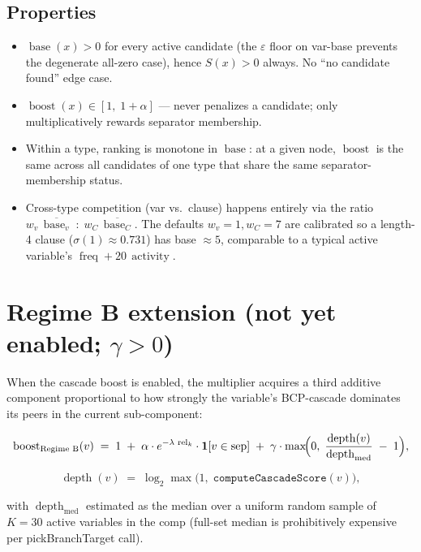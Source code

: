 \documentclass[11pt]{article}
\begin{document}
\subsection*{Properties}

\begin{itemize}
  \item $\operatorname{base}(x) > 0$ for every active candidate (the
        $\varepsilon$ floor on var-base prevents the degenerate
        all-zero case), hence $S(x) > 0$ always. No ``no candidate found'' edge case.
  \item $\operatorname{boost}(x) \in [1,\; 1+\alpha]$ --- never penalizes a candidate;
        only multiplicatively rewards separator membership.
  \item Within a type, ranking is monotone in $\operatorname{base}$: at a
        given node, $\operatorname{boost}$ is the same across all candidates of one
        type that share the same separator-membership status.
  \item Cross-type competition (var vs.\ clause) happens entirely via the
        ratio $w_v \, \overline{\operatorname{base}_v} \;:\; w_C \, \overline{\operatorname{base}_C}$.
        The defaults $w_v = 1, w_C = 7$ are calibrated so a length-4 clause
        ($\sigma(1) \approx 0.731$) has base $\approx 5$, comparable to a typical
        active variable's $\operatorname{freq} + 20\,\operatorname{activity}$.
\end{itemize}

\section{Regime B extension (not yet enabled; $\gamma > 0$)}

When the cascade boost is enabled, the multiplier acquires a third additive
component proportional to how strongly the variable's BCP-cascade dominates
its peers in the current sub-component:

\[
\operatorname{boost}_{\text{Regime B}}(v) \;=\; 1
   \;+\; \alpha \cdot e^{-\lambda \, \operatorname{rel}_k} \cdot \mathbf{1}[v \in \mathrm{sep}]
   \;+\; \gamma \cdot \max\!\Bigl(0,\; \frac{\operatorname{depth}(v)}{\operatorname{depth}_{\mathrm{med}}} \;-\; 1\Bigr),
\]

\[
\operatorname{depth}(v) \;=\; \log_2 \max\bigl(1,\; \mathtt{computeCascadeScore}(v)\bigr),
\]

with $\operatorname{depth}_{\mathrm{med}}$ estimated as the median over a uniform
random sample of $K = 30$ active variables in the comp (full-set median is
prohibitively expensive per pickBranchTarget call).
\end{document}
